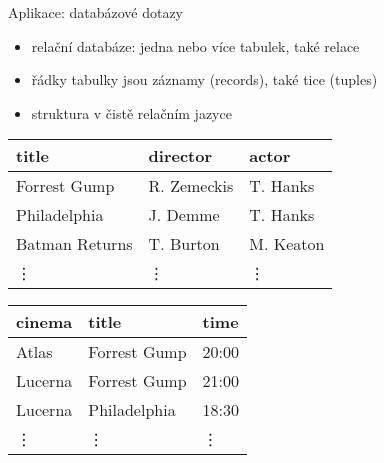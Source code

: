 \documentclass{beamer}
\begin{document}
\begin{frame}{Aplikace: databázové dotazy}
    
    \begin{itemize}
        \item \alert{relační databáze}: jedna nebo více \alert{tabulek}, také \alert{relace}
        \item řádky tabulky jsou \alert{záznamy (records)}, také \alert{tice (tuples)}
        \item struktura v čistě relačním jazyce
    \end{itemize}

    \medskip

    {\ttfamily\scriptsize

        \hspace{2cm}{\bf\small Movies}
        
        \hspace{2cm}\begin{tabular}{lll}
            title          & director    & actor \\ \hline
            Forrest Gump   & R. Zemeckis & T. Hanks      \\
            Philadelphia   & J. Demme    & T. Hanks      \\
            Batman Returns & T. Burton   & M. Keaton     \\
            \vdots         & \vdots      & \vdots
        \end{tabular} 
 
        \hspace{2cm}{\bf\small Program}

        \hspace{2cm}\begin{tabular}{lll}
            cinema         & title          & time   \\ \hline
            Atlas          & Forrest Gump   & 20:00  \\
            Lucerna        & Forrest Gump   & 21:00  \\
            Lucerna        & Philadelphia   & 18:30  \\
            \vdots         & \vdots         & \vdots
        \end{tabular}

    }

\end{frame}
\end{document}
